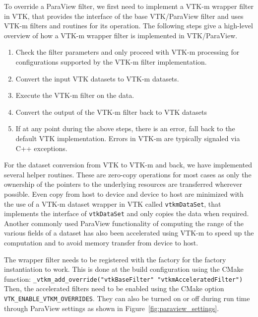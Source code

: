 To override a ParaView filter, we first need to implement a VTK-m wrapper filter in VTK, that provides the interface of the base VTK/ParaView filter and uses VTK-m filters and routines for its operation. The following steps give a high-level overview of how a VTK-m wrapper filter is implemented in VTK/ParaView.
\begin{enumerate}
    \item Check the filter parameters and only proceed with VTK-m processing for configurations supported by the VTK-m filter implementation.
    \item Convert the input VTK datasets to VTK-m datasets. 
    \item Execute the VTK-m filter on the data.
    \item Convert the output of the VTK-m filter back to VTK datasets
    \item If at any point during the above steps, there is an error, fall back to the default VTK implementation. Errors in VTK-m are typically signaled via C++ exceptions.
\end{enumerate}

For the dataset conversion from VTK to VTK-m and back, we have implemented several helper routines. These are zero-copy operations for most cases as only the ownership of the pointers to the underlying resources are transferred wherever possible. Even copy from host to device and device to host are minimized with the use of a VTK-m dataset wrapper in VTK called \texttt{vtkmDataSet}, that implements the interface of \texttt{vtkDataSet} and only copies the data when required. Another commonly used ParaView functionality of computing the range of the various fields of a dataset has also been accelerated using VTK-m to speed up the computation and to avoid memory transfer from device to host.

The wrapper filter needs to be registered with the factory for the factory instantiation to work. This is done at the build configuration using the CMake function:
\texttt{\_vtkm\_add\_override("vtkBaseFilter" "vtkmAcceleratedFilter")} Then, the accelerated filters need to be enabled using the CMake option \texttt{VTK\_ENABLE\_VTKM\_OVERRIDES}. They can also be turned on or off during run time through ParaView settings as shown in Figure~\ref{fig:paraview_settings}.

